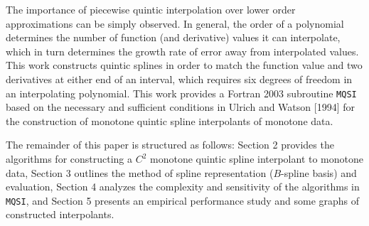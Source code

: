 The importance of piecewise quintic interpolation over lower order
approximations can be simply observed. In general, the order of a
polynomial determines the number of function (and derivative) values
it can interpolate, which in turn determines the growth rate of error
away from interpolated values. This work constructs quintic splines in
order to match the function value and two derivatives at either end of
an interval, which requires six degrees of freedom in an interpolating
polynomial. This work provides a Fortran 2003 subroutine {\tt MQSI}
based on the necessary and sufficient conditions in Ulrich and Watson
[1994] for the construction of monotone quintic spline interpolants of
monotone data.

The remainder of this paper is structured as follows: Section 2 provides
the algorithms for constructing a $C^2$ monotone quintic spline interpolant
to monotone data, Section 3 outlines the method of spline representation
($B$-spline basis) and evaluation, Section 4 analyzes the complexity and
sensitivity of the algorithms in {\tt MQSI}, and Section 5 presents an
empirical performance study and some graphs of constructed interpolants.


